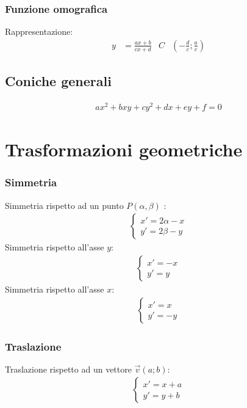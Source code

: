 \documentclass[a4paper]{article}
\begin{document}
	\subsubsection{Funzione omografica}
	Rappresentazione:
	\begin{align*}
	y &= \frac{ax + b}{cx + d}		&		C&\left( -\frac{d}{c} ; \frac{a}{c} \right)
	\end{align*}
	
	\subsection{Coniche generali}
	\begin{align*}
		ax^2+bxy+cy^2+dx+ey+f=0
	\end{align*}
	
	
	
	\newpage	
	\section{Trasformazioni geometriche}
	\subsubsection{Simmetria}
	 Simmetria rispetto ad un punto $P(\alpha , \beta)$ :
	 \begin{align*}
	 	\begin{cases}
	 	x' = 2 \alpha - x \\
	 	y' = 2 \beta -y 
	 	\end{cases}
	 \end{align*}
	 Simmetria rispetto all'asse $y$:
	 \begin{align*}
	 	\begin{cases}
	 	x' = -x\\
	 	y' = y
	 	\end{cases}
	 \end{align*}
	Simmetria rispetto all'asse $x$:
	\begin{align*}
		\begin{cases}
			x' = x\\
			y' = -y
		\end{cases}
	\end{align*}
	
	\subsubsection{Traslazione}
	Traslazione rispetto ad un vettore $\vec{v} (a;b)$:
	\begin{align*}
		\begin{cases}
			x'=x+a\\
			y'=y+b
		\end{cases}
	\end{align*}
	
\end{document}
